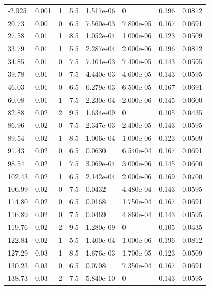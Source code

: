\documentclass[preview]{standalone}
\begin{document}
{{\begin{tabular}{L{1.2cm}C{1.2cm} C{0.3cm}C{0.5cm} C{1.4cm}C{1.4cm} C{1.4cm}C{1.4cm}}
  -2.925  &  0.001  & 1     & 5.5 &  1.517e-06  & 0  & 0.196 &  0.0812   \\ 
  20.73  &  0.00  & 0     & 6.5 &  7.560e-03  & 7.800e-05  & 0.167 &  0.0691   \\ 
  27.58  &  0.01  & 1     & 8.5 &  1.052e-04  & 1.000e-06  & 0.123 &  0.0509   \\ 
  33.79  &  0.01  & 1     & 5.5 &  2.287e-04  & 2.000e-06  & 0.196 &  0.0812   \\ 
  34.85  &  0.01  & 0     & 7.5 &  7.101e-03  & 7.400e-05  & 0.143 &  0.0595   \\ 
  39.78  &  0.01  & 0     & 7.5 &  4.440e-03  & 4.600e-05  & 0.143 &  0.0595   \\ 
  46.03  &  0.01  & 0     & 6.5 &  6.279e-03  & 6.500e-05  & 0.167 &  0.0691   \\ 
  60.08  &  0.01  & 1     & 7.5 &  2.230e-04  & 2.000e-06  & 0.145 &  0.0600   \\ 
  82.88  &  0.02  & 2     & 9.5 &  1.634e-09  & 0  & 0.105 &  0.0435   \\ 
  86.96  &  0.02  & 0     & 7.5 &  2.347e-03  & 2.400e-05  & 0.143 &  0.0595   \\ 
  89.54  &  0.02  & 1     & 8.5 &  1.006e-04  & 1.000e-06  & 0.123 &  0.0509   \\ 
  91.43  &  0.02  & 0     & 6.5 &  0.0630  & 6.540e-04  & 0.167 &  0.0691   \\ 
  98.54  &  0.02  & 1     & 7.5 &  3.069e-04  & 3.000e-06  & 0.145 &  0.0600   \\ 
  102.43  &  0.02  & 1     & 6.5 &  2.142e-04  & 2.000e-06  & 0.169 &  0.0700   \\ 
  106.99  &  0.02  & 0     & 7.5 &  0.0432  & 4.480e-04  & 0.143 &  0.0595   \\ 
  114.80  &  0.02  & 0     & 6.5 &  0.0168  & 1.750e-04  & 0.167 &  0.0691   \\ 
  116.89  &  0.02  & 0     & 7.5 &  0.0469  & 4.860e-04  & 0.143 &  0.0595   \\ 
  119.76  &  0.02  & 2     & 9.5 &  1.280e-09  & 0  & 0.105 &  0.0435   \\ 
  122.84  &  0.02  & 1     & 5.5 &  1.400e-04  & 1.000e-06  & 0.196 &  0.0812   \\ 
  127.29  &  0.03  & 1     & 8.5 &  1.676e-03  & 1.700e-05  & 0.123 &  0.0509   \\ 
  130.23  &  0.03  & 0     & 6.5 &  0.0708  & 7.350e-04  & 0.167 &  0.0691   \\ 
  138.73  &  0.03  & 2     & 7.5 &  5.840e-10  & 0  & 0.143 &  0.0595   \\ 

\end{tabular}}}
\end{document}
